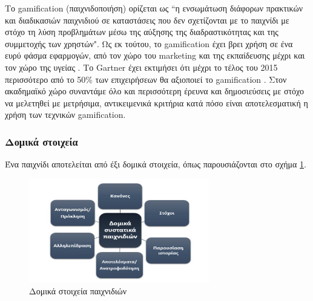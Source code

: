 		Το gamification (παιχνιδοποιήση) ορίζεται ως ``η ενσωμάτωση διάφορων πρακτικών και διαδικασιών παιχνιδιού σε καταστάσεις που δεν σχετίζονται με το παιχνίδι με στόχο τη λύση προβλημάτων μέσω της αύξησης της διαδραστικότητας και της συμμετοχής των χρηστών"\cite{Deterding:2011:GDE:2181037.2181040}\cite{Rojas:2013:MPG:2583008.2583033}. Ως εκ τούτου, το gamification έχει βρει χρήση σε ένα ευρύ φάσμα εφαρμογών, από τον χώρο του marketing και της εκπαίδευσης μέχρι και τον χώρο της υγείας \cite{6758978}. Το Gartner έχει εκτιμήσει ότι μέχρι το τέλος του 2015 περισσότερο από το 50\% των επιχειρήσεων θα αξιοποιεί το gamification \cite{gartnerGamification}. Στον ακαδημαϊκό χώρο συναντάμε όλο και περισσότερη έρευνα και δημοσιεύσεις με στόχο να μελετηθεί με μετρήσιμα, αντικειμενικά κριτήρια κατά πόσο είναι αποτελεσματική η χρήση των τεχνικών gamification. 

	\subsubsection{Δομικά στοιχεία}
	Ένα παιχνίδι αποτελείται από έξι δομικά στοιχεία, όπως παρουσιάζονται στο σχήμα \ref{fig:gamification_components}.
		
		\begin{figure}[h]
		    \centering
		    \includegraphics[width=0.7\textwidth]{gamification_components.jpg}
		    \caption{Δομικά στοιχεία παιχνιδιών}
		    \label{fig:gamification_components}
		\end{figure}
	
